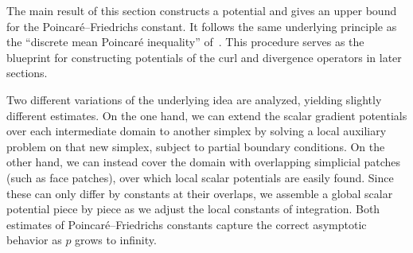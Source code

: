 \documentclass[10pt,a4paper]{article}
\begin{document}




The main result of this section constructs a potential and gives an upper bound for the Poincar\'e--Friedrichs constant.  
It follows the same underlying principle as the ``discrete mean Poincar\'e inequality'' of~\cite[Lemma~3.7]{Eym_Gal_Her_00}.
This procedure serves as the blueprint for constructing potentials of the curl and divergence operators in later sections. 

Two different variations of the underlying idea are analyzed, yielding slightly different estimates. 
On the one hand, we can extend the scalar gradient potentials over each intermediate domain to another simplex by solving a local auxiliary problem on that new simplex, subject to partial boundary conditions. 
On the other hand, we can instead cover the domain with overlapping simplicial patches (such as face patches), over which local scalar potentials are easily found. Since these can only differ by constants at their overlaps, we assemble a global scalar potential piece by piece as we adjust the local constants of integration. 
Both estimates of Poincar\'e--Friedrichs constants capture the correct asymptotic behavior as $p$ grows to infinity.
\end{document}
